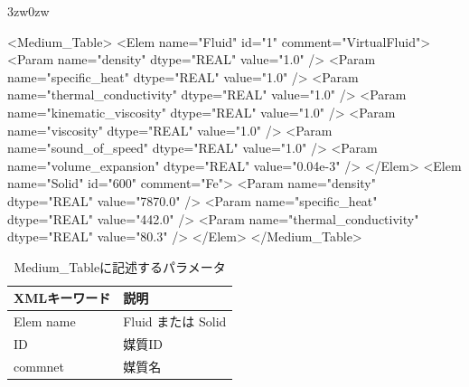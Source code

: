 \begin{indentation}{3zw}{0zw}
{ \small
\begin{program}
<Medium_Table>
  <Elem name="Fluid" id="1" comment="VirtualFluid">
    <Param name="density" dtype="REAL" value="1.0" />
    <Param name="specific_heat" dtype="REAL" value="1.0" />
    <Param name="thermal_conductivity" dtype="REAL" value="1.0" />
    <Param name="kinematic_viscosity" dtype="REAL" value="1.0" />
    <Param name="viscosity" dtype="REAL" value="1.0" />
    <Param name="sound_of_speed" dtype="REAL" value="1.0" />
    <Param name="volume_expansion" dtype="REAL" value="0.04e-3" />
  </Elem>
  <Elem name="Solid" id="600" comment="Fe">
    <Param name="density" dtype="REAL" value="7870.0" />
    <Param name="specific_heat" dtype="REAL" value="442.0" />
    <Param name="thermal_conductivity" dtype="REAL" value="80.3" />
  </Elem>
</Medium_Table>
\end{program}
}

\begin{table}[htdp]
\small
\caption{Medium\_Tableに記述するパラメータ}
\begin{center}
\begin{tabular}{ll} \toprule
XMLキーワード & 説明\\ \midrule
Elem name & Fluid または Solid\\
ID & 媒質ID\\
commnet & 媒質名\\ \bottomrule
\end{tabular}
\end{center}
\label{tbl:MTLentry}
\end{table}



\end{indentation}
